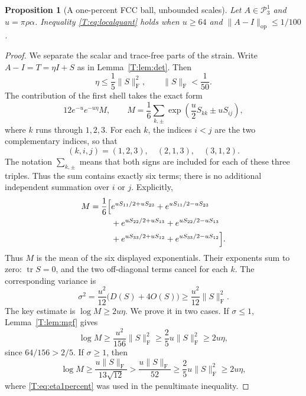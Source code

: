 \documentclass[reqno,english]{amsart}
\newtheorem{proposition}[theorem]{Proposition}
\theoremstyle{definition}
\newtheorem{open problem}[theorem]{Open Problem}
\theoremstyle{remark}
\theoremstyle{plain}
\numberwithin{equation}{section}
\newcommand{\PP}{\mathcal P_3^1}
\newcommand{\tr}{\operatorname{tr}}
\newcommand{\op}{\mathrm{op}}
\newcommand{\frob}{\mathrm F}
\newcommand{\Id}{I}
\begin{document}
\begin{proposition}[A one-percent FCC ball, unbounded scales]\label{T:prop:smallballlarge}
Let $A\in\PP$ and $u=\pi\rho\alpha$. Inequality \eqref{T:eq:localquant} holds when $u\ge64$ and $\|A-\Id\|_{\op}\le1/100$.
\end{proposition}
\begin{proof}
We separate the scalar and trace-free parts of the strain. Write
$A-\Id=T=\eta\Id+S$ as in Lemma~\ref{T:lem:det}. Then
\begin{equation}\label{T:eq:eta1percent}
 \eta\le\frac15\|S\|_{\frob}^2,
 \qquad \|S\|_{\frob}<\frac1{50}.
\end{equation}
The contribution of the first shell takes the exact form
\begin{equation}\label{T:eq:firstmgf}
 12e^{-u}e^{-u\eta}M,
 \qquad
 M=\frac16\sum_{k,\pm}
 \exp\left(\frac u2S_{kk}\pm uS_{ij}\right),
\end{equation}
where $k$ runs through $1,2,3$. For each $k$, the indices $i<j$
are the two complementary indices, so that
\[
 (k,i,j)=(1,2,3),\quad (2,1,3),\quad (3,1,2).
\]
The notation $\sum_{k,\pm}$ means that both signs are included for each
of these three triples. Thus the sum contains exactly six terms;
there is no additional independent summation over $i$ or $j$.
Explicitly,
\[
\begin{aligned}
 M=\frac16\Bigl[{}
 &e^{uS_{11}/2+uS_{23}}+e^{uS_{11}/2-uS_{23}}\\
 &+e^{uS_{22}/2+uS_{13}}+e^{uS_{22}/2-uS_{13}}\\
 &+e^{uS_{33}/2+uS_{12}}+e^{uS_{33}/2-uS_{12}}
 \Bigr].
\end{aligned}
\]
Thus $M$ is the mean of the six displayed exponentials. Their
exponents sum to zero: $\tr S=0$, and the two off-diagonal terms
cancel for each $k$. The corresponding variance is
\begin{equation}\label{T:eq:variance}
 \sigma^2=\frac{u^2}{12}\bigl(D(S)+4O(S)\bigr)
 \ge\frac{u^2}{12}\|S\|_{\frob}^2.
\end{equation}
The key estimate is $\log M\ge2u\eta$. We prove it in two cases.
If $\sigma\le1$, Lemma~\ref{T:lem:mgf} gives
\[
 \log M\ge\frac{u^2}{156}\|S\|_{\frob}^2
 \ge\frac25u\|S\|_{\frob}^2\ge2u\eta,
\]
since $64/156>2/5$. If $\sigma\ge1$, then
\[
 \log M\ge\frac{u\|S\|_{\frob}}{13\sqrt{12}}
 >\frac{u\|S\|_{\frob}}{52}
 \ge\frac25u\|S\|_{\frob}^2\ge2u\eta,
\]
where \eqref{T:eq:eta1percent} was used in the penultimate inequality.


\end{proof}
\end{document}
